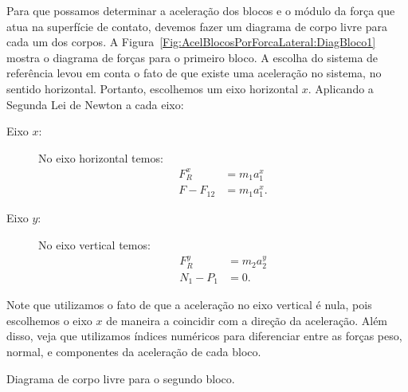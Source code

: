Para que possamos determinar a aceleração dos blocos e o módulo da força que atua na superfície de contato, devemos fazer um diagrama de corpo livre para cada um dos corpos. A Figura~\ref{Fig:AcelBlocosPorForcaLateral:DiagBloco1} mostra o diagrama de forças para o primeiro bloco. A escolha do sistema de referência levou em conta o fato de que existe uma aceleração no sistema, no sentido horizontal. Portanto, escolhemos um eixo horizontal $x$. Aplicando a Segunda Lei de Newton a cada eixo:
\begin{description}
    \item[Eixo $x$:] No eixo horizontal temos:
        \begin{align}
            F_R^x &= m_1 a_1^x \\
            F - F_{12} &= m_1 a_1^x.
        \end{align}
    \item[Eixo $y$:] No eixo vertical temos:
        \begin{align}
            F_R^y &= m_2 a_2^y \\
            N_1 - P_1 &= 0.
        \end{align}
\end{description}
%
Note que utilizamos o fato de que a aceleração no eixo vertical é nula, pois escolhemos o eixo $x$ de maneira a coincidir com a direção da aceleração. Além disso, veja que utilizamos índices numéricos para diferenciar entre as forças peso, normal, e componentes da aceleração de cada bloco. 

\begin{marginfigure}
\centering
{}
\caption{Diagrama de corpo livre para o segundo bloco.\label{Fig:AcelBlocosPorForcaLateral:DiagBloco2}}
\end{marginfigure}

